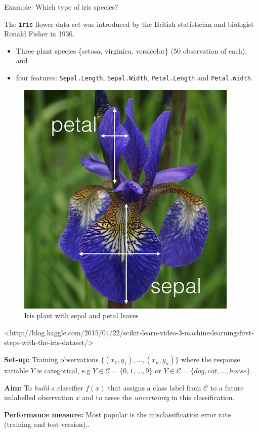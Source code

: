 \documentclass[10pt,ignorenonframetext,]{beamer}
\providecommand{\tightlist}{%
  \setlength{\itemsep}{0pt}\setlength{\parskip}{0pt}}
\begin{document}
\begin{frame}[fragile]

\begin{block}{Example: Which type of iris species?}

The \texttt{iris} flower data set was introduced by the British
statistician and biologist Ronald Fisher in 1936.

\begin{itemize}
\tightlist
\item
  Three plant species \{setosa, virginica, versicolor\} (50 observation
  of each), and
\item
  four features: \texttt{Sepal.Length}, \texttt{Sepal.Width},
  \texttt{Petal.Length} and \texttt{Petal.Width}.
\end{itemize}

\begin{figure}
\includegraphics[width=0.3\linewidth]{iris} \caption{Iris plant with sepal and petal leaves}\label{fig:iris_pic}
\end{figure}

\scriptsize
<http://blog.kaggle.com/2015/04/22/scikit-learn-video-3-machine-learning-first-steps-with-the-iris-dataset/>

\end{block}

\end{frame}

\begin{frame}

\textbf{Set-up:} Training observations
\(\{(x_1, y_1), ..., (x_n, y_n)\}\) where the response variable \(Y\) is
categorical, e.g \(Y \in \mathcal{C} = \{0, 1, ..., 9\}\) or
\(Y \in \mathcal{C} = \{dog, cat,... ,horse\}\).

\textbf{Aim: } To \emph{build} a classifier \(f(x)\) that assigns a
class label from \(\mathcal{C}\) to a future unlabelled observation
\(x\) and to asses the \emph{uncertainty} in this classification.

\textbf{Performance measure:} Most popular is the misclassification
error rate (training and test version)..

\end{frame}
\end{document}
